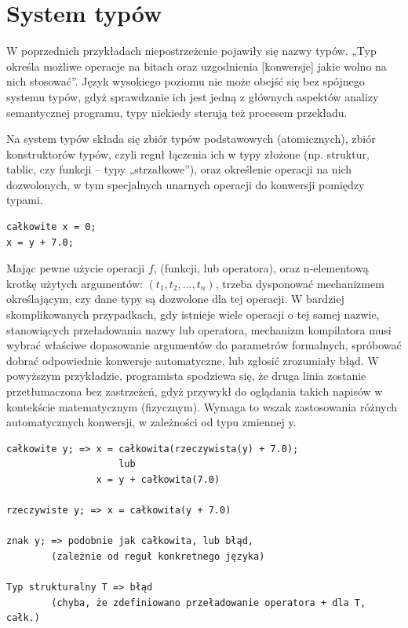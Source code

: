 \section{System typów}
W poprzednich przykładach niepostrzeżenie pojawiły się nazwy typów. „Typ określa możliwe operacje na bitach oraz uzgodnienia [konwersje] jakie wolno na nich stosować”\cite[str.~259]{waite_goos}. Język wysokiego poziomu nie może obejść się bez spójnego systemu typów, gdyż sprawdzanie ich jest jedną z głównych aspektów analizy semantycznej programu, typy niekiedy sterują też procesem przekładu.

Na system typów składa się zbiór typów podstawowych (atomicznych), zbiór konstruktorów typów, czyli reguł łączenia ich w typy złożone (np. struktur, tablic, czy funkcji – typy „strzałkowe”), oraz określenie operacji na nich dozwolonych, w tym specjalnych unarnych operacji do konwersji pomiędzy typami.
\begin{lstlisting}
całkowite x = 0;
x = y + 7.0;
\end{lstlisting}
Mając pewne użycie operacji $f$, (funkcji, lub operatora), oraz n-elementową krotkę użytych argumentów: $(t_1, t_2, ..., t_n)$, trzeba dysponować mechanizmem określającym, czy dane typy są dozwolone dla tej operacji. W bardziej skomplikowanych przypadkach, gdy istnieje wiele operacji o tej samej nazwie, stanowiących przeładowania nazwy lub operatora, mechanizm kompilatora musi wybrać właściwe dopasowanie argumentów do parametrów formalnych, spróbować dobrać odpowiednie konwersje automatyczne, lub zgłosić zrozumiały błąd.
W powyższym przykładzie, programista spodziewa się, że druga linia zostanie przetłumaczona bez zastrzeżeń, gdyż przywykł do oglądania takich napisów w kontekście matematycznym (fizycznym). Wymaga to wszak zastosowania różnych automatycznych konwersji, w zależności od typu zmiennej y.
\begin{lstlisting}
całkowite y; => x = całkowita(rzeczywista(y) + 7.0); 
                    lub
                x = y + całkowita(7.0)
                
rzeczywiste y; => x = całkowita(y + 7.0)

znak y; => podobnie jak całkowita, lub błąd, 
        (zależnie od reguł konkretnego języka)

Typ strukturalny T => błąd
        (chyba, że zdefiniowano przeładowanie operatora + dla T, całk.)
\end{lstlisting}


